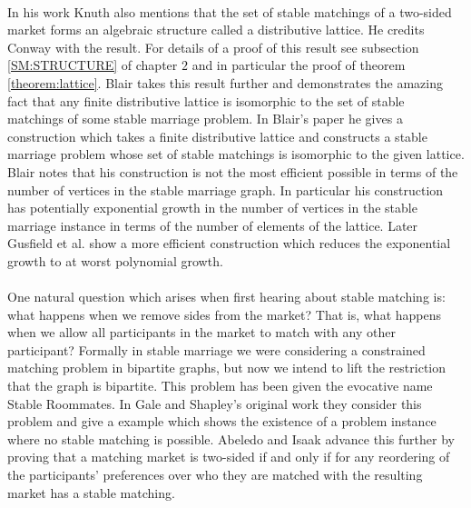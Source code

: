\paragraph{}
In his work Knuth also mentions that the set of stable matchings of a two-sided market forms an algebraic structure called a distributive lattice. He credits Conway with the result. For details of a proof of this result see subsection \ref{SM:STRUCTURE} of chapter $2$ and in particular the proof of theorem \ref{theorem:lattice}. Blair  \cite{blair1984every} takes this result further and demonstrates the amazing fact that any finite distributive lattice is isomorphic to the set of stable matchings of some stable marriage problem. In Blair's paper he gives a construction which takes a finite distributive lattice and constructs a stable marriage problem whose set of stable matchings is isomorphic to the given lattice. Blair notes that his construction is not the most efficient possible in terms of the number of vertices in the stable marriage graph. In particular his construction has potentially exponential growth in the number of vertices in the stable marriage instance in terms of the number of elements of the lattice. Later Gusfield et al. \cite{gusfield1987every} show a more efficient construction which reduces the exponential growth to at worst polynomial growth. 
\paragraph{}
One natural question which arises when first hearing about stable matching is: what happens when we remove sides from the market? That is, what happens when we allow all participants in the market to match with any other participant? Formally in stable marriage we were considering a constrained matching problem in bipartite graphs, but now we intend to lift the restriction that the graph is bipartite. This problem has been given the evocative name Stable Roommates. In Gale and Shapley's original work \cite{gale1962college} they consider this problem and give a example which shows the existence of a problem instance where no stable matching is possible.  Abeledo and Isaak \cite{abeledo1991characterization} advance this further by proving that a matching market is two-sided if and only if for any reordering of the participants' preferences over who they are matched with the resulting market has a stable matching.

